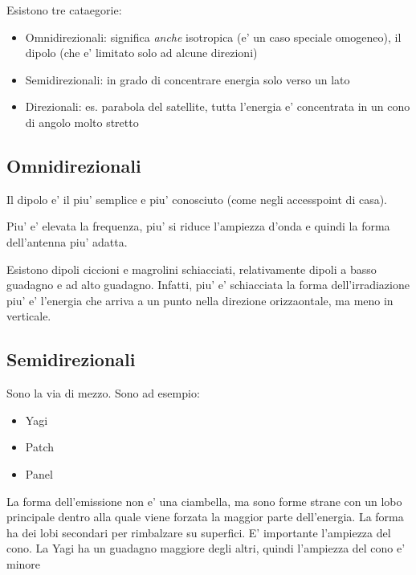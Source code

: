 Esistono tre cataegorie:
\begin{itemize}
  \item Omnidirezionali: significa \textit{anche} isotropica (e' un caso speciale omogeneo), il dipolo (che e' limitato solo ad alcune direzioni)
  \item Semidirezionali: in grado di concentrare energia solo verso un lato
  \item Direzionali: es. parabola del satellite, tutta l'energia e' concentrata in un cono di angolo molto stretto
\end{itemize}

\subsection{Omnidirezionali}
Il dipolo e' il piu' semplice e piu' conosciuto (come negli accesspoint di casa). 


Piu' e' elevata la frequenza, piu' si riduce l'ampiezza d'onda e quindi la forma dell'antenna piu' adatta.

Esistono dipoli ciccioni e magrolini schiacciati, relativamente dipoli a basso guadagno e ad alto guadagno. Infatti, piu' e' schiacciata la forma dell'irradiazione piu' e' l'energia che arriva a un punto nella direzione orizzaontale, ma meno in verticale. 


\subsection{Semidirezionali}
Sono la via di mezzo. Sono ad esempio:
\begin{itemize}
\item Yagi
  \item Patch
  \item Panel
\end{itemize}

La forma dell'emissione non e' una ciambella, ma sono forme strane con un lobo principale dentro alla quale viene forzata la maggior parte dell'energia. La forma ha dei lobi secondari per rimbalzare su superfici. E' importante l'ampiezza del cono. La Yagi ha un guadagno maggiore degli altri, quindi l'ampiezza del cono e' minore

